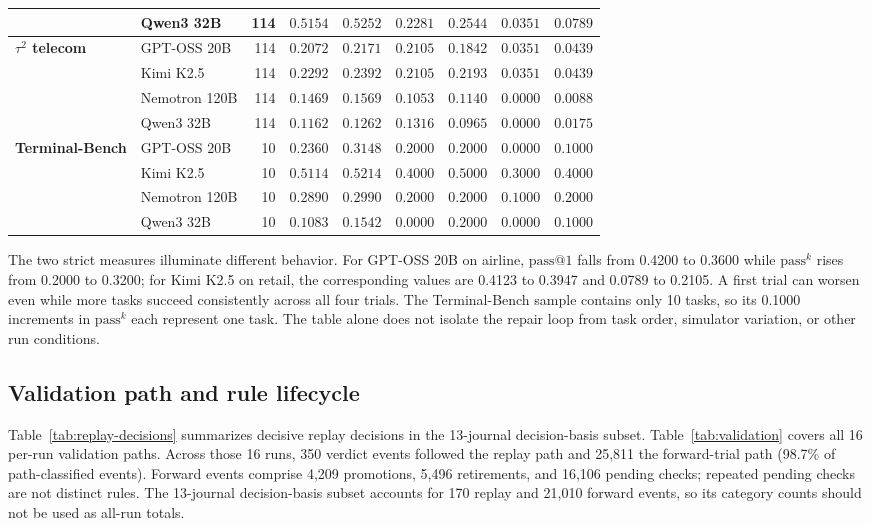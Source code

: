 \documentclass[11pt,letterpaper]{article}
\makeatletter
\newcommand{\passk}{\mathrm{pass}^{k}}
\newcommand{\passone}{\mathrm{pass@}1}
\makeatother
\begin{document}
\begin{table}[H]
\begin{tabular*}{\linewidth}{@{\extracolsep{\fill}}llrcccccc@{}}
 & Qwen3 32B & 114 & $0.5154$ & $\mathbf{0.5252}$ & $0.2281$ & $\mathbf{0.2544}$ & $0.0351$ & $\mathbf{0.0789}$ \\
\midrule
\textbf{$\tau^2$ telecom} & GPT-OSS 20B & 114 & $0.2072$ & $\mathbf{0.2171}$ & $0.2105$ & $0.1842$ & $0.0351$ & $\mathbf{0.0439}$ \\
 & Kimi K2.5 & 114 & $0.2292$ & $\mathbf{0.2392}$ & $0.2105$ & $\mathbf{0.2193}$ & $0.0351$ & $\mathbf{0.0439}$ \\
 & Nemotron 120B & 114 & $0.1469$ & $\mathbf{0.1569}$ & $0.1053$ & $\mathbf{0.1140}$ & $0.0000$ & $\mathbf{0.0088}$ \\
 & Qwen3 32B & 114 & $0.1162$ & $\mathbf{0.1262}$ & $0.1316$ & $0.0965$ & $0.0000$ & $\mathbf{0.0175}$ \\
\midrule
\textbf{Terminal-Bench} & GPT-OSS 20B & 10 & $0.2360$ & $\mathbf{0.3148}$ & $0.2000$ & $0.2000$ & $0.0000$ & $\mathbf{0.1000}$ \\
 & Kimi K2.5 & 10 & $0.5114$ & $\mathbf{0.5214}$ & $0.4000$ & $0.5000$ & $0.3000$ & $\mathbf{0.4000}$ \\
 & Nemotron 120B & 10 & $0.2890$ & $\mathbf{0.2990}$ & $0.2000$ & $0.2000$ & $0.1000$ & $\mathbf{0.2000}$ \\
 & Qwen3 32B & 10 & $0.1083$ & $\mathbf{0.1542}$ & $0.0000$ & $0.2000$ & $0.0000$ & $\mathbf{0.1000}$ \\
\bottomrule
\end{tabular*}
\end{table}



\noindent
The two strict measures illuminate different behavior. For GPT-OSS 20B on
airline, $\passone$ falls from 0.4200 to 0.3600 while $\passk$ rises from
0.2000 to 0.3200; for Kimi K2.5 on retail, the corresponding values are
0.4123 to 0.3947 and 0.0789 to 0.2105. A first trial can worsen even
while more tasks succeed consistently across all four trials. The
Terminal-Bench sample contains only 10 tasks, so its 0.1000 increments in
$\passk$ each represent one task. The table alone does not isolate the
repair loop from task order, simulator variation, or other run conditions.

\subsection{Validation path and rule lifecycle}
\label{sec:validation-results}
Table~\ref{tab:replay-decisions} summarizes decisive replay decisions in
the 13-journal decision-basis subset.
Table~\ref{tab:validation} covers all 16 per-run validation paths.
Across those 16 runs, 350 verdict events followed the replay path and
25,811 the forward-trial path (98.7\% of path-classified events). Forward
events comprise 4,209 promotions, 5,496 retirements, and 16,106 pending
checks; repeated pending checks are not distinct rules. The 13-journal
decision-basis subset accounts for 170 replay and 21,010 forward events,
so its category counts should not be used as all-run totals.
\end{document}

